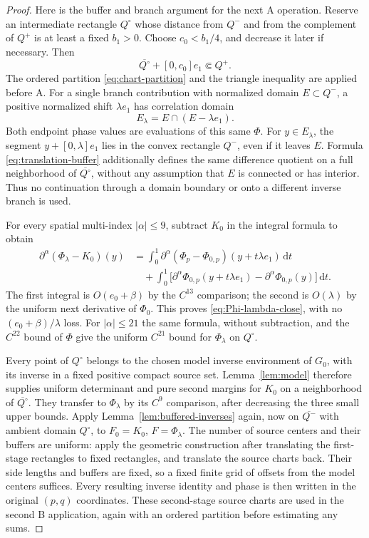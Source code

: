 \documentclass[11pt,a4paper]{article}
\numberwithin{equation}{section}
\theoremstyle{remark}
\newcommand{\dd}{\,\mathrm d}
\begin{document}
\begin{proof}
Here is the buffer and branch argument for the next A operation. Reserve
an intermediate rectangle $Q^\circ$ whose distance from $Q^-$ and from
the complement of $Q^+$ is at least a fixed $b_1>0$. Choose
$c_0<b_1/4$, and decrease it later if necessary. Then
\begin{equation}\label{eq:translation-buffer}
 \overline{Q^\circ}+[0,c_0]e_1\Subset Q^+.
\end{equation}
The ordered partition \eqref{eq:chart-partition} and the triangle
inequality are applied before A. For a single branch contribution with
normalized domain $E\subset Q^-$, a positive normalized shift
$\lambda e_1$ has correlation domain
\begin{equation}\label{eq:normalized-correlation-domain}
 E_\lambda=E\cap(E-\lambda e_1).
\end{equation}
Both endpoint phase values are evaluations of this same $\Phi$.
For $y\in E_\lambda$, the segment $y+[0,\lambda]e_1$ lies in the
convex rectangle $Q^-$, even if it leaves $E$. Formula
\eqref{eq:translation-buffer} additionally defines the same difference
quotient on a full neighborhood of $\overline{Q^\circ}$, without any
assumption that $E$ is connected or has interior. Thus no continuation
through a domain boundary or onto a different inverse branch is used.

For every spatial multi-index $|\alpha|\le9$, subtract $K_0$ in the
integral formula to obtain
\begin{align*}
 \partial^\alpha(\Phi_\lambda-K_0)(y)
 &=\int_0^1\partial^\alpha(\Phi_p-\Phi_{0,p})
                           (y+t\lambda e_1)\dd t\\
 &\quad+\int_0^1\bigl[\partial^\alpha\Phi_{0,p}
               (y+t\lambda e_1)-\partial^\alpha\Phi_{0,p}(y)\bigr]\dd t.
\end{align*}
The first integral is $O(e_0+\beta)$ by the $C^{13}$ comparison; the
second is $O(\lambda)$ by the uniform next derivative of $\Phi_0$.
This proves \eqref{eq:Phi-lambda-close}, with no
$(e_0+\beta)/\lambda$ loss. For $|\alpha|\le21$ the same formula,
without subtraction, and the $C^{22}$ bound of $\Phi$ give the uniform
$C^{21}$ bound for $\Phi_\lambda$ on $Q^\circ$.

Every point of $Q^\circ$ belongs to the chosen model inverse environment
of $G_0$, with its inverse in a fixed positive compact source set.
Lemma~\ref{lem:model} therefore supplies uniform determinant and pure
second margins for $K_0$ on a neighborhood of $\overline{Q^\circ}$.
They transfer to $\Phi_\lambda$ by its $C^9$ comparison, after decreasing
the three small upper bounds. Apply Lemma~\ref{lem:buffered-inverses}
again, now on $\overline{Q^-}$ with ambient domain $Q^\circ$, to
$F_0=K_0$, $F=\Phi_\lambda$. The number of source centers and their
buffers are uniform: apply the geometric construction after translating
the first-stage rectangles to fixed rectangles, and translate the source
charts back. Their side lengths and buffers are fixed, so a fixed finite
grid of offsets from the model centers suffices. Every resulting inverse
identity and phase is then written in the original $(p,q)$ coordinates.
These second-stage source charts are used in the second B
application, again with an ordered partition before estimating any sums.


\end{proof}
\end{document}
